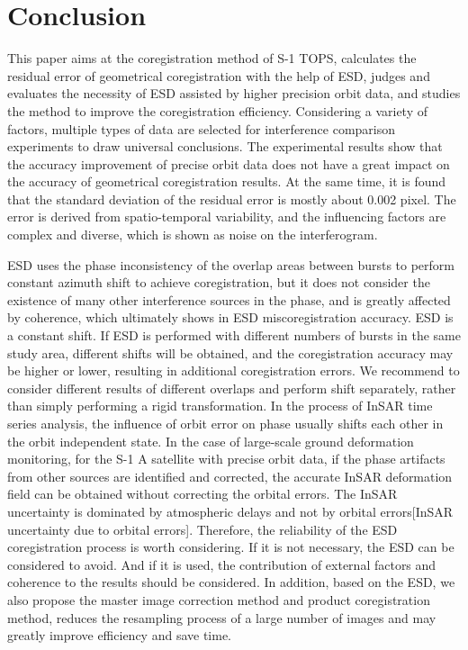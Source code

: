 \documentclass[a4paper,fleqn]{cas-dc}
\begin{document}
\section{Conclusion}
This paper aims at the coregistration method of S-1 TOPS, calculates the residual error of geometrical coregistration with the help of ESD, judges and evaluates the necessity of ESD assisted by higher precision orbit data, and studies the method to improve the coregistration efficiency. Considering a variety of factors, multiple types of data are selected for interference comparison experiments to draw universal conclusions. The experimental results show that the accuracy improvement of precise orbit data does not have a great impact on the accuracy of geometrical coregistration results. At the same time, it is found that the standard deviation of the residual error is mostly about 0.002 pixel. The error is derived from spatio-temporal variability, and the influencing factors are complex and diverse, which is shown as noise on the interferogram. \par
ESD uses the phase inconsistency of the overlap areas between bursts to perform constant azimuth shift to achieve coregistration, but it does not consider the existence of many other interference sources in the phase, and is greatly affected by coherence, which ultimately shows in ESD miscoregistration accuracy. ESD is a constant shift. If ESD is performed with different numbers of bursts in the same study area, different shifts will be obtained, and the coregistration accuracy may be higher or lower, resulting in additional coregistration errors. We recommend to consider different results of different overlaps and perform shift separately, rather than simply performing a rigid transformation. In the process of InSAR time series analysis, the influence of orbit error on phase usually shifts each other in the orbit independent state. In the case of large-scale ground deformation monitoring, for the S-1 A satellite with precise orbit data, if the phase artifacts from other sources are identified and corrected, the accurate InSAR deformation field can be obtained without correcting the orbital errors. The InSAR uncertainty is dominated by atmospheric delays and not by orbital errors[InSAR uncertainty due to orbital errors]. Therefore, the reliability of the ESD coregistration process is worth considering. If it is not necessary, the ESD can be considered to avoid. And if it is used, the contribution of external factors and coherence to the results should be considered. In addition, based on the ESD, we also propose the master image correction method and product coregistration method, reduces the resampling process of a large number of images and may greatly improve efficiency and save time. \par
\end{document}
